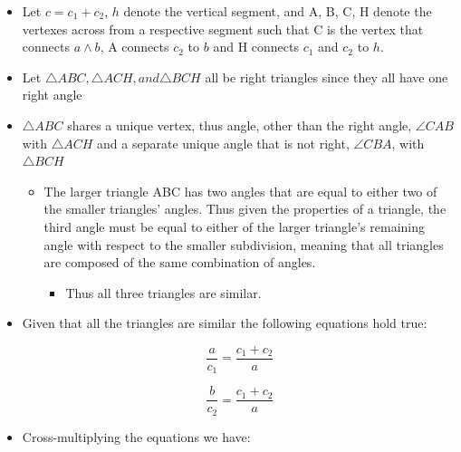 \documentclass[]{report}
\begin{document}
\begin{itemize}
	\item Let $ c =  c_1 + c_2 $, $h$ denote the vertical segment, and A, B, C, H denote the vertexes across from a respective segment such that C is the vertex that connects $a \land b$,  A connects $c_{2}$ to $b$ and H connects $c_1$  and $c_2$ to $h$.
	
	\item Let $\triangle ABC , \triangle ACH, and \triangle BCH$ all be right triangles since they all have one right angle  
	
	\item $\triangle ABC $ shares a unique vertex, thus angle, other than the right angle, $\angle CAB$  with $\triangle ACH$ and a separate unique angle that is not right, $\angle CBA$, with $\triangle  BCH$
	
	\begin{itemize}
		\item The larger triangle ABC has two  angles that are equal to either two of the smaller triangles' angles.  Thus given the properties of a triangle, the third angle must be equal to either of the larger triangle's remaining angle with respect to the smaller subdivision, meaning that all triangles are composed of the same combination  of angles.
		\begin{itemize}
			\item Thus all three triangles are similar.
		\end{itemize}
	\end{itemize}
	
	\item  Given that all the triangles are similar the following equations hold true:
					\begin{center}
						
						\begin{equation}
							\frac{a}{c_{1}} = \frac{ c_{1} + c_{2}}{a} 
						\end{equation}  
					
						\begin{equation}
							 \frac{b}{c_{2}} = \frac{ c_{1} + c_{2}}{a} 
						\end{equation}
						
					\end{center}
					
	\item Cross-multiplying the equations we have:
					\begin{center}
						

\end{center}
\end{itemize}
\end{document}
